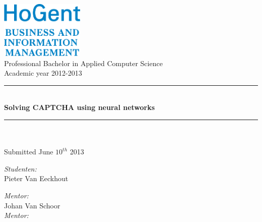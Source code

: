 \documentclass[pdftex,a4paper,12pt,twoside]{report}
\newcommand{\HRule}{\rule{\linewidth}{0.5mm}}
\theoremstyle{plain} \newtheorem{theorem}{Theorem} \newtheorem{proposition}{Proposition} \newtheorem{lemma}{Lemma} \newtheorem*{corollary}{Corollary}
\theoremstyle{definition} \newtheorem{definition}{Definition} \newtheorem{conjecture}{Conjecture} \newtheorem*{example}{Example} \newtheorem{algorithm}{Algorithm}
\theoremstyle{remark} \newtheorem*{remark}{Remark} \newtheorem*{note}{Note} \newtheorem{case}{Case}
\newcommand{\captchasp}{CAPTCHA }
\newcommand{\studenta}{Pieter {Van Eeckhout}}
\newcommand{\begeleider}{Johan {Van Schoor}}
\newcommand{\titel}{Solving \captchasp using neural networks}
\newcommand{\ondertitel}{}
\newcommand{\datum}{June $10^{th}$ 2013}
\newcommand{\academiejaar}{2012-2013}
\begin{document}

\begin{titlepage}
\begin{center}
\includegraphics[width=4cm]{./img/FBO-EN.png}\\[.5cm]




Professional Bachelor in Applied Computer Science\\
Academic year \academiejaar

\vfill

\HRule \\[0.4cm]
{ \huge \bfseries \titel}\\[0.4cm]
\HRule \\[0.4cm]

{\Large \ondertitel}\\[0.4cm]

Submitted \datum

\vfill

\begin{minipage}{0.49\textwidth}
\begin{flushleft}
\emph{Student\ifdefined\studentb en\fi :}\\
\studenta \\
\ifdefined\studentb \studentb \fi\par
\end{flushleft}
\end{minipage}
\begin{minipage}{0.49\textwidth}
\begin{flushright}
\emph{Mentor:}\\ \begeleider\\
\ifdefined\mentor \emph{Mentor:}\\ \mentor \fi
\end{flushright}
\end{minipage}

\end{center}

\end{titlepage}

\end{document}
